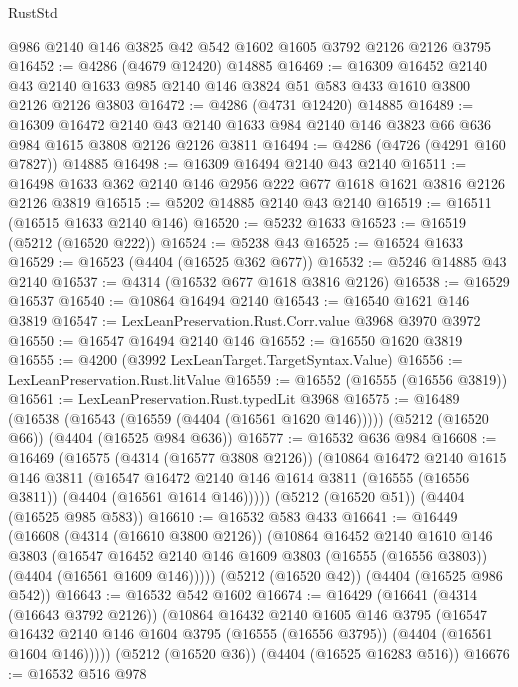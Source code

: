 \begin{lexlean}{RustStd}
\begin{coremodule}
    @986
    @2140
    @146
    @3825
    @42
    @542
    @1602
    @1605
    @3792
    @2126
    @2126
    @3795
@16452 := @4286 (@4679 @12420) @14885
@16469 := @16309
    @16452
    @2140
    @43
    @2140
    @1633
    @985
    @2140
    @146
    @3824
    @51
    @583
    @433
    @1610
    @3800
    @2126
    @2126
    @3803
@16472 := @4286 (@4731 @12420) @14885
@16489 := @16309
    @16472
    @2140
    @43
    @2140
    @1633
    @984
    @2140
    @146
    @3823
    @66
    @636
    @984
    @1615
    @3808
    @2126
    @2126
    @3811
@16494 := @4286 (@4726 (@4291 @160 @7827)) @14885
@16498 := @16309 @16494 @2140 @43 @2140
@16511 := @16498 @1633 @362 @2140 @146 @2956 @222 @677 @1618 @1621 @3816 @2126 @2126 @3819
@16515 := @5202 @14885 @2140 @43 @2140
@16519 := @16511 (@16515 @1633 @2140 @146)
@16520 := @5232 @1633
@16523 := @16519 (@5212 (@16520 @222))
@16524 := @5238 @43
@16525 := @16524 @1633
@16529 := @16523 (@4404 (@16525 @362 @677))
@16532 := @5246 @14885 @43 @2140
@16537 := @4314 (@16532 @677 @1618 @3816 @2126)
@16538 := @16529 @16537
@16540 := @10864 @16494 @2140
@16543 := @16540 @1621 @146 @3819
@16547 := LexLeanPreservation.Rust.Corr.value @3968 @3970 @3972
@16550 := @16547 @16494 @2140 @146
@16552 := @16550 @1620 @3819
@16555 := @4200 (@3992 LexLeanTarget.TargetSyntax.Value)
@16556 := LexLeanPreservation.Rust.litValue
@16559 := @16552 (@16555 (@16556 @3819))
@16561 := LexLeanPreservation.Rust.typedLit @3968
@16575 := @16489
    (@16538 (@16543 (@16559 (@4404 (@16561 @1620 @146)))))
    (@5212 (@16520 @66))
    (@4404 (@16525 @984 @636))
@16577 := @16532 @636 @984
@16608 := @16469
    (@16575
      (@4314 (@16577 @3808 @2126))
      (@10864
        @16472
        @2140
        @1615
        @146
        @3811
        (@16547 @16472 @2140 @146 @1614 @3811 (@16555 (@16556 @3811)) (@4404 (@16561 @1614 @146)))))
    (@5212 (@16520 @51))
    (@4404 (@16525 @985 @583))
@16610 := @16532 @583 @433
@16641 := @16449
    (@16608
      (@4314 (@16610 @3800 @2126))
      (@10864
        @16452
        @2140
        @1610
        @146
        @3803
        (@16547 @16452 @2140 @146 @1609 @3803 (@16555 (@16556 @3803)) (@4404 (@16561 @1609 @146)))))
    (@5212 (@16520 @42))
    (@4404 (@16525 @986 @542))
@16643 := @16532 @542 @1602
@16674 := @16429
    (@16641
      (@4314 (@16643 @3792 @2126))
      (@10864
        @16432
        @2140
        @1605
        @146
        @3795
        (@16547 @16432 @2140 @146 @1604 @3795 (@16555 (@16556 @3795)) (@4404 (@16561 @1604 @146)))))
    (@5212 (@16520 @36))
    (@4404 (@16525 @16283 @516))
@16676 := @16532 @516 @978

\end{coremodule}
\end{lexlean}

